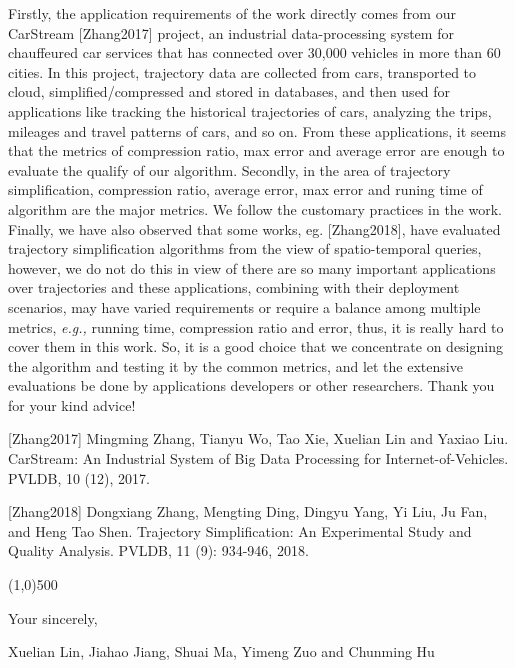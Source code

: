 \documentclass{letter}
\newcommand{\eg}{\emph{e.g.,}\xspace}
\begin{document}
Firstly, the application requirements of the work directly comes from our CarStream [Zhang2017] project, an industrial data-processing system for chauffeured car services that has connected over 30,000 vehicles in more than 60 cities. In this project, trajectory data are collected from cars, transported to cloud, simplified/compressed and stored in databases, and then used for applications like tracking the historical trajectories of cars, analyzing the trips, mileages and travel patterns of cars, and so on. From these applications, it seems that the metrics of compression ratio, max error and average error are enough to evaluate the qualify of our algorithm. 
%
Secondly, in the area of trajectory simplification, compression ratio, average error, max error and runing time of algorithm are the major metrics. We follow the customary practices in the work. 
%
Finally, we have also observed that some {works}, eg. [Zhang2018], have evaluated trajectory simplification algorithms from the view of spatio-temporal queries, however, we do not do this in view of there are so many important applications over trajectories and these applications, combining with their deployment scenarios, may have varied requirements or require a balance among multiple metrics, \eg running time, compression ratio and error, thus, it is really hard to cover them in this work. 
%
So, it is a good choice that we concentrate on designing the algorithm and testing it by the common metrics, and let the extensive evaluations be done by applications developers or other researchers. Thank you for your kind advice!

[Zhang2017] Mingming Zhang, Tianyu Wo, Tao Xie, Xuelian Lin and Yaxiao Liu. CarStream: An Industrial System of Big Data Processing for Internet-of-Vehicles. PVLDB, 10 (12), 2017.

[Zhang2018] Dongxiang Zhang, Mengting Ding, Dingyu Yang, Yi Liu, Ju Fan, and Heng Tao Shen. Trajectory Simplification: An Experimental Study and Quality Analysis. PVLDB, 11 (9): 934-946, 2018.

\line(1,0){500}



Your sincerely,

Xuelian Lin, Jiahao Jiang, Shuai Ma, Yimeng Zuo and Chunming Hu



%
%
\end{document}
